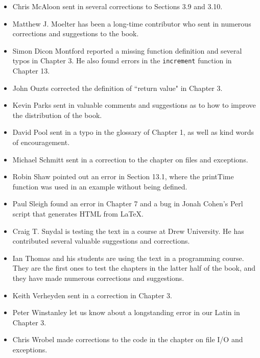 \begin{itemize}
\item Chris McAloon sent in several corrections to Sections 3.9 and
3.10.

\item Matthew J. Moelter has been a long-time contributor who sent
in numerous corrections and suggestions to the book.  

\item Simon Dicon Montford reported a missing function definition and
several typos in Chapter 3.  He also found errors in the \texttt{increment}
function in Chapter 13.

\item John Ouzts corrected the definition of ``return value"
in Chapter 3.

\item Kevin Parks sent in valuable comments and suggestions as to how
to improve the distribution of the book.

\item David Pool sent in a typo in the glossary of Chapter 1, as well
as kind words of encouragement.

\item Michael Schmitt sent in a correction to the chapter on files
and exceptions.

\item Robin Shaw pointed out an error in Section 13.1, where the
printTime function was used in an example without being defined.

\item Paul Sleigh found an error in Chapter 7 and a bug in Jonah Cohen's
Perl script that generates HTML from LaTeX.

\item Craig T. Snydal is testing the text in a course at Drew
University.  He has contributed several valuable suggestions and corrections.

\item Ian Thomas and his students are using the text in a programming
course.  They are the first ones to test the chapters in the latter half
of the book, and they have made numerous corrections and suggestions.

\item Keith Verheyden sent in a correction in Chapter 3.

\item Peter Winstanley let us know about a longstanding error in
our Latin in Chapter 3.

\item Chris Wrobel made corrections to the code in the chapter on
file I/O and exceptions. 


\end{itemize}
